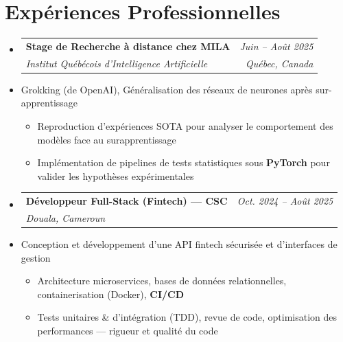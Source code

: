 \documentclass[a4paper,11pt]{article}
\makeatletter
\newcommand{\resumeItem}[1]{\item\small{#1}}
\newcommand{\resumeSubheading}[4]{
  \vspace{-2pt}\item
    \begin{tabular*}{0.97\textwidth}[t]{l@{\extracolsep{\fill}}r}
      \textbf{#1} & \textit{\small #2} \\
      \textit{\small #3} & \textit{\small #4} \\
    \end{tabular*}\vspace{-5pt}
}
\makeatother
\begin{document}
\section{Expériences Professionnelles}
\begin{itemize}[leftmargin=*, label={}]

    \resumeSubheading
      {Stage de Recherche à distance chez MILA}{Juin -- Août 2025}
      {Institut Québécois d'Intelligence Artificielle}{Québec, Canada}
      \resumeItem{Grokking (de OpenAI), Généralisation des réseaux de neurones après sur-apprentissage}
      \begin{itemize}[leftmargin=0.4cm, nosep, label=\tiny$\bullet$]
        \item \small{Reproduction d'expériences SOTA pour analyser le comportement des modèles face au surapprentissage}
        \item \small{Implémentation de pipelines de tests statistiques sous \textbf{PyTorch} pour valider les hypothèses expérimentales}
      \end{itemize}
    \vspace{2pt}

    \resumeSubheading
      {Développeur Full-Stack (Fintech) — CSC}{Oct. 2024 -- Août 2025}
      {Douala, Cameroun}{}
      \resumeItem{Conception et développement d'une API fintech sécurisée et d'interfaces de gestion}
      \begin{itemize}[leftmargin=0.4cm, nosep, label=\tiny$\bullet$]
        \item \small{Architecture microservices, bases de données relationnelles, containerisation (Docker), \textbf{CI/CD}}
        \item \small{Tests unitaires \& d'intégration (TDD), revue de code, optimisation des performances — rigueur et qualité du code}
      \end{itemize}
    \vspace{2pt}

\end{itemize}

\end{document}
